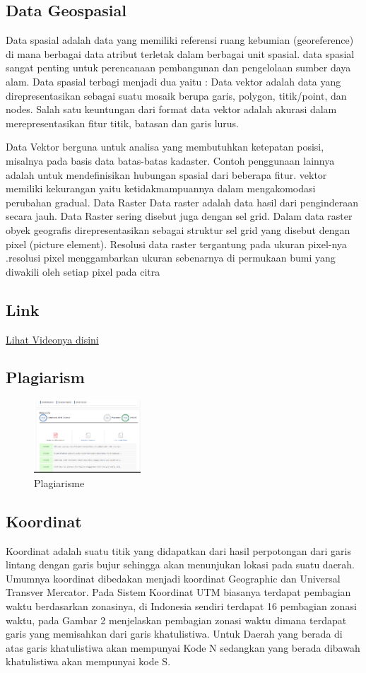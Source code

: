 \subsection{Data Geospasial}
Data spasial adalah data yang memiliki referensi ruang kebumian (georeference) di mana berbagai data atribut terletak dalam berbagai unit spasial. data spasial  sangat penting untuk perencanaan pembangunan dan pengelolaan sumber daya alam.
Data spasial terbagi menjadi dua yaitu :
Data vektor adalah data yang direpresentasikan sebagai suatu mosaik berupa garis, polygon, titik/point, dan nodes. Salah satu keuntungan dari format data vektor adalah akurasi dalam merepresentasikan fitur titik, batasan dan garis lurus.

Data Vektor berguna untuk analisa yang membutuhkan ketepatan posisi, misalnya pada basis data batas-batas kadaster. Contoh penggunaan lainnya adalah untuk mendefinisikan hubungan spasial dari beberapa fitur. vektor memiliki kekurangan yaitu ketidakmampuannya dalam mengakomodasi perubahan gradual.
	Data Raster
Data raster adalah data hasil dari penginderaan secara jauh. Data Raster sering disebut juga dengan sel grid. Dalam data raster obyek geografis direpresentasikan sebagai struktur sel grid yang disebut dengan pixel (picture element). Resolusi data raster tergantung pada ukuran pixel-nya .resolusi pixel menggambarkan ukuran sebenarnya di permukaan bumi yang diwakili oleh setiap pixel pada citra
\subsection{Link}
\href{https://www.youtube.com/watch?v=TdQz3NogjzM}{Lihat Videonya disini}
\subsection{Plagiarism}
\begin{figure}[H]
	\includegraphics[width=4cm]{figures/1154016/plagiat.png}
	\centering
	\caption{Plagiarisme}
\end{figure}

\subsection{Koordinat}
Koordinat adalah suatu titik yang didapatkan dari hasil perpotongan dari garis lintang dengan garis bujur sehingga akan menunjukan lokasi pada suatu daerah. Umumnya koordinat dibedakan menjadi koordinat Geographic dan Universal Transver Mercator.
Pada Sistem Koordinat UTM biasanya terdapat pembagian waktu berdasarkan zonasinya, di Indonesia sendiri terdapat 16 pembagian zonasi waktu, pada Gambar 2 menjelaskan pembagian zonasi waktu dimana terdapat garis yang memisahkan dari garis khatulistiwa. Untuk Daerah yang berada di atas garis khatulistiwa akan mempunyai Kode N sedangkan yang berada dibawah khatulistiwa akan mempunyai kode S.


